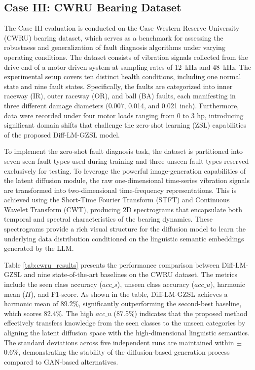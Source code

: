 \subsection{Case III: CWRU Bearing Dataset}
The Case III evaluation is conducted on the Case Western Reserve University (CWRU) bearing dataset, which serves as a benchmark for assessing the robustness and generalization of fault diagnosis algorithms under varying operating conditions. The dataset consists of vibration signals collected from the drive end of a motor-driven system at sampling rates of 12~kHz and 48~kHz. The experimental setup covers ten distinct health conditions, including one normal state and nine fault states. Specifically, the faults are categorized into inner raceway (IR), outer raceway (OR), and ball (BA) faults, each manifesting in three different damage diameters (0.007, 0.014, and 0.021 inch). Furthermore, data were recorded under four motor loads ranging from 0 to 3 hp, introducing significant domain shifts that challenge the zero-shot learning (ZSL) capabilities of the proposed Diff-LM-GZSL model.

To implement the zero-shot fault diagnosis task, the dataset is partitioned into seven seen fault types used during training and three unseen fault types reserved exclusively for testing. To leverage the powerful image-generation capabilities of the latent diffusion module, the raw one-dimensional time-series vibration signals are transformed into two-dimensional time-frequency representations. This is achieved using the Short-Time Fourier Transform (STFT) and Continuous Wavelet Transform (CWT), producing 2D spectrograms that encapsulate both temporal and spectral characteristics of the bearing dynamics. These spectrograms provide a rich visual structure for the diffusion model to learn the underlying data distribution conditioned on the linguistic semantic embeddings generated by the LLM.

Table \ref{tab:cwru_results} presents the performance comparison between Diff-LM-GZSL and nine state-of-the-art baselines on the CWRU dataset. The metrics include the seen class accuracy ($acc\_s$), unseen class accuracy ($acc\_u$), harmonic mean ($H$), and F1-score. As shown in the table, Diff-LM-GZSL achieves a harmonic mean of 89.2\%, significantly outperforming the second-best baseline, which scores 82.4\%. The high $acc\_u$ (87.5\%) indicates that the proposed method effectively transfers knowledge from the seen classes to the unseen categories by aligning the latent diffusion space with the high-dimensional linguistic semantics. The standard deviations across five independent runs are maintained within $\pm$0.6\%, demonstrating the stability of the diffusion-based generation process compared to GAN-based alternatives.

